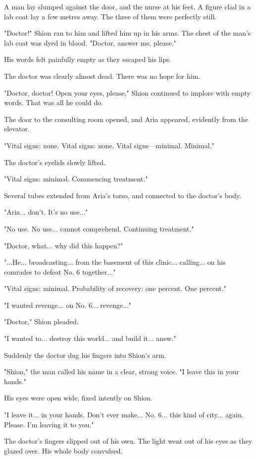 A man lay slumped against the door, and the nurse at his feet. A figure
clad in a lab coat lay a few metres away. The three of them were
perfectly still.

"Doctor!" Shion ran to him and lifted him up in his arms. The chest of
the man's lab coat was dyed in blood. "Doctor, answer me, please."

His words felt painfully empty as they escaped his lips.

The doctor was clearly almost dead. There was no hope for him.

"Doctor, doctor! Open your eyes, please," Shion continued to implore
with empty words. That was all he could do.

The door to the consulting room opened, and Aria appeared, evidently
from the elevator.

{\sffamily "Vital signs: none. Vital signs: none. Vital signs---minimal. Minimal."}

The doctor's eyelids slowly lifted.

{\sffamily "Vital signs: minimal. Commencing treatment."}

Several tubes extended from Aria's torso, and connected to the doctor's
body.

"Aria... don't. It's no use..."

{\sffamily "No use. No use... cannot comprehend. Continuing treatment."}

"Doctor, what... why did this happen?"

"...He... broadcasting... from the basement of this clinic... calling...
on his comrades to defeat No. 6 together..."

{\sffamily "Vital signs: minimal. Probability of recovery: one percent. One
percent."}

"I wanted revenge... on No. 6... revenge..."

"Doctor," Shion pleaded.

"I wanted to... destroy this world... and build it... anew."

Suddenly the doctor dug his fingers into Shion's arm.

"Shion," the man called his name in a clear, strong voice. "I leave this
in your hands."

His eyes were open wide, fixed intently on Shion.

"I leave it... in your hands. Don't ever make... No. 6... this kind of
city... again. Please. I'm leaving it to you."

The doctor's fingers slipped out of his own. The light went out of his
eyes as they glazed over. His whole body convulsed.

